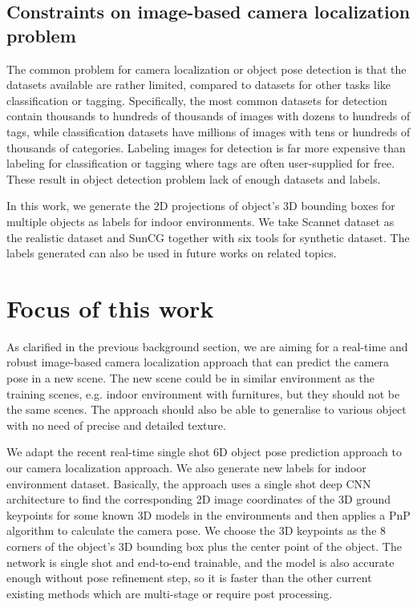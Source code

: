 \subsection{Constraints on image-based camera localization problem}

The common problem for camera localization or object pose detection is that the datasets available are rather limited, compared to datasets for other tasks like classification or tagging. Specifically, the most common datasets for detection contain thousands to hundreds of thousands of images with dozens to hundreds of tags, while classification datasets have millions of images with tens or hundreds of thousands of categories. Labeling images for detection is far more expensive than labeling for classification or tagging where tags are often user-supplied for free. These result in object detection problem lack of enough datasets and labels.

In this work, we generate the 2D projections of object's 3D bounding boxes for multiple objects as labels for indoor environments. We take Scannet dataset as the realistic dataset and SunCG together with six tools for synthetic dataset. The labels generated can also be used in future works on related topics.


\section{Focus of this work}

As clarified in the previous background section, we are aiming for a real-time and robust image-based camera localization approach that can predict the camera pose in a new scene. The new scene could be in similar environment as the training scenes, e.g. indoor environment with furnitures, but they should not be the same scenes. The approach should also be able to generalise to various object with no need of precise and detailed texture.

We adapt the recent real-time single shot 6D object pose prediction approach \cite{tekin2018real} to our camera localization approach. We also generate new labels for indoor environment dataset. Basically, the approach uses a single shot deep CNN architecture to find the corresponding 2D image coordinates of the 3D ground keypoints for some known 3D models in the environments and then applies a PnP algorithm to calculate the camera pose. We choose the 3D keypoints as the 8 corners of the object's 3D bounding box plus the center point of the object. The network is single shot and end-to-end trainable, and the model is also accurate enough without pose refinement step, so it is faster than the other current existing methods which are multi-stage or require post processing. 


